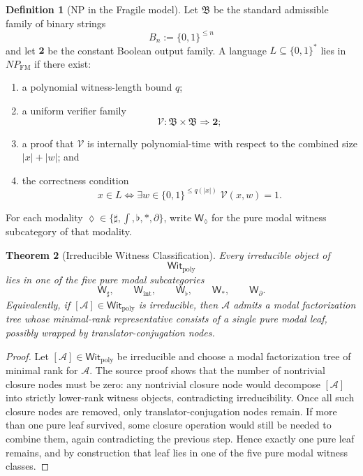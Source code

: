 \documentclass[11pt]{article}
\newtheorem{theorem}{Theorem}[section]
\theoremstyle{definition}
\newtheorem{definition}[theorem]{Definition}
\theoremstyle{remark}
\newcommand{\NPFM}{NP_{\mathrm{FM}}}
\newcommand{\Witpoly}{\mathsf{Wit}_{\mathrm{poly}}}
\begin{document}
\begin{definition}[NP in the Fragile model]\label{def-np-fragile}
Let $\mathfrak B$ be the standard admissible family of binary strings
\[
B_n := \{0,1\}^{\le n}
\]
and let $\mathbf 2$ be the constant Boolean output family. A language $L \subseteq \{0,1\}^*$ lies in $\NPFM$ if there exist:
\begin{enumerate}
\item a polynomial witness-length bound $q$;
\item a uniform verifier family
\[
\mathcal V : \mathfrak B \times \mathfrak B \Rightarrow \mathbf 2;
\]
\item a proof that $\mathcal V$ is internally polynomial-time with respect to the combined size $|x| + |w|$; and
\item the correctness condition
\[
x \in L \iff \exists w \in \{0,1\}^{\le q(|x|)}\; \mathcal V(x,w) = 1.
\]
\end{enumerate}
\end{definition}

For each modality $\lozenge \in \{\sharp, \int, \flat, \ast, \partial\}$, write $\mathsf W_\lozenge$ for the pure modal witness subcategory of that modality.

\begin{theorem}[Irreducible Witness Classification]\label{thm-irreducible-witness-classification}
Every irreducible object of
\[
\Witpoly
\]
lies in one of the five pure modal subcategories
\[
\mathsf W_\sharp,
\qquad
\mathsf W_{\mathrm{int}},
\qquad
\mathsf W_\flat,
\qquad
\mathsf W_\ast,
\qquad
\mathsf W_\partial.
\]
Equivalently, if $[\mathcal A] \in \Witpoly$ is irreducible, then $\mathcal A$ admits a modal factorization tree whose minimal-rank representative consists of a single pure modal leaf, possibly wrapped by translator-conjugation nodes.
\end{theorem}

\begin{proof}
Let $[\mathcal A] \in \Witpoly$ be irreducible and choose a modal factorization tree of minimal rank for $\mathcal A$. The source proof shows that the number of nontrivial closure nodes must be zero: any nontrivial closure node would decompose $[\mathcal A]$ into strictly lower-rank witness objects, contradicting irreducibility. Once all such closure nodes are removed, only translator-conjugation nodes remain. If more than one pure leaf survived, some closure operation would still be needed to combine them, again contradicting the previous step. Hence exactly one pure leaf remains, and by construction that leaf lies in one of the five pure modal witness classes.
\end{proof}
\end{document}
